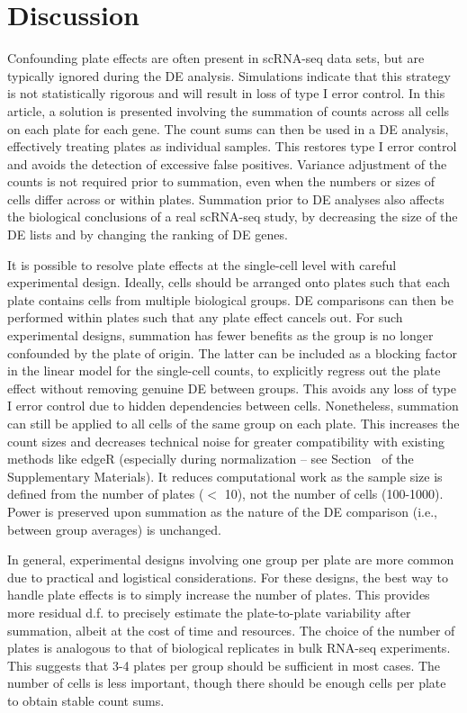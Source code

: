 \documentclass[oupdraft]{bio}
\begin{document}
\section{Discussion}
Confounding plate effects are often present in scRNA-seq data sets, but are typically ignored during the DE analysis.
Simulations indicate that this strategy is not statistically rigorous and will result in loss of type I error control. 
In this article, a solution is presented involving the summation of counts across all cells on each plate for each gene.
The count sums can then be used in a DE analysis, effectively treating plates as individual samples.
This restores type I error control and avoids the detection of excessive false positives.
Variance adjustment of the counts is not required prior to summation, even when the numbers or sizes of cells differ across or within plates.
Summation prior to DE analyses also affects the biological conclusions of a real scRNA-seq study, 
    by decreasing the size of the DE lists and by changing the ranking of DE genes.

It is possible to resolve plate effects at the single-cell level with careful experimental design.
Ideally, cells should be arranged onto plates such that each plate contains cells from multiple biological groups.
DE comparisons can then be performed within plates such that any plate effect cancels out.
For such experimental designs, summation has fewer benefits as the group is no longer confounded by the plate of origin.
The latter can be included as a blocking factor in the linear model for the single-cell counts, 
    to explicitly regress out the plate effect without removing genuine DE between groups.
This avoids any loss of type I error control due to hidden dependencies between cells.
Nonetheless, summation can still be applied to all cells of the same group on each plate.
This increases the count sizes and decreases technical noise for greater compatibility with existing methods like edgeR
    (especially during normalization -- see Section~\suppnorm{} of the Supplementary Materials).
It reduces computational work as the sample size is defined from the number of plates ($<$ 10), not the number of cells (100-1000).
Power is preserved upon summation as the nature of the DE comparison (i.e., between group averages) is unchanged.

In general, experimental designs involving one group per plate are more common due to practical and logistical considerations.
For these designs, the best way to handle plate effects is to simply increase the number of plates.
This provides more residual d.f. to precisely estimate the plate-to-plate variability after summation, albeit at the cost of time and resources.
The choice of the number of plates is analogous to that of biological replicates in bulk RNA-seq experiments.
This suggests that 3-4 plates per group should be sufficient in most cases.
The number of cells is less important, though there should be enough cells per plate to obtain stable count sums.
\end{document}
